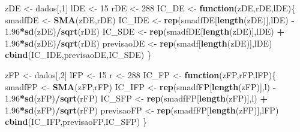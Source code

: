 \documentclass[]{article}
\newenvironment{Shaded}{\begin{snugshade}}{\end{snugshade}}
\newcommand{\ControlFlowTok}[1]{\textcolor[rgb]{0.13,0.29,0.53}{\textbf{#1}}}
\newcommand{\DecValTok}[1]{\textcolor[rgb]{0.00,0.00,0.81}{#1}}
\newcommand{\FloatTok}[1]{\textcolor[rgb]{0.00,0.00,0.81}{#1}}
\newcommand{\KeywordTok}[1]{\textcolor[rgb]{0.13,0.29,0.53}{\textbf{#1}}}
\newcommand{\NormalTok}[1]{#1}
\newcommand{\OperatorTok}[1]{\textcolor[rgb]{0.81,0.36,0.00}{\textbf{#1}}}
\newcommand{\StringTok}[1]{\textcolor[rgb]{0.31,0.60,0.02}{#1}}
\begin{document}
\begin{Shaded}
\begin{Highlighting}[]
\NormalTok{zDE <-}\StringTok{ }\NormalTok{dados[,}\DecValTok{1}\NormalTok{]}
\NormalTok{lDE <-}\StringTok{ }\DecValTok{15}
\NormalTok{rDE <-}\StringTok{ }\DecValTok{288}
\NormalTok{IC_DE <-}\StringTok{ }\ControlFlowTok{function}\NormalTok{(zDE,rDE,lDE)\{}
\NormalTok{smadfDE <-}\StringTok{ }\KeywordTok{SMA}\NormalTok{(zDE,rDE)}
\NormalTok{IC_IDE <-}\StringTok{ }\KeywordTok{rep}\NormalTok{(smadfDE[}\KeywordTok{length}\NormalTok{(zDE)],lDE) }\OperatorTok{-}\StringTok{ }\FloatTok{1.96}\OperatorTok{*}\KeywordTok{sd}\NormalTok{(zDE)}\OperatorTok{/}\KeywordTok{sqrt}\NormalTok{(rDE)}
\NormalTok{IC_SDE <-}\StringTok{ }\KeywordTok{rep}\NormalTok{(smadfDE[}\KeywordTok{length}\NormalTok{(zDE)],lDE) }\OperatorTok{+}\StringTok{ }\FloatTok{1.96}\OperatorTok{*}\KeywordTok{sd}\NormalTok{(zDE)}\OperatorTok{/}\KeywordTok{sqrt}\NormalTok{(rDE)}
\NormalTok{previsaoDE <-}\StringTok{ }\KeywordTok{rep}\NormalTok{(smadf[}\KeywordTok{length}\NormalTok{(zDE)],lDE)}
\KeywordTok{cbind}\NormalTok{(IC_IDE,previsaoDE,IC_SDE)}
\NormalTok{\}}


\NormalTok{zFP <-}\StringTok{ }\NormalTok{dados[,}\DecValTok{2}\NormalTok{]}
\NormalTok{lFP <-}\StringTok{ }\DecValTok{15}
\NormalTok{r <-}\StringTok{ }\DecValTok{288}
\NormalTok{IC_FP <-}\StringTok{ }\ControlFlowTok{function}\NormalTok{(zFP,rFP,lFP)\{}
\NormalTok{smadfFP <-}\StringTok{ }\KeywordTok{SMA}\NormalTok{(zFP,rFP)}
\NormalTok{IC_IFP <-}\StringTok{ }\KeywordTok{rep}\NormalTok{(smadfFP[}\KeywordTok{length}\NormalTok{(zFP)],l) }\OperatorTok{-}\StringTok{ }\FloatTok{1.96}\OperatorTok{*}\KeywordTok{sd}\NormalTok{(zFP)}\OperatorTok{/}\KeywordTok{sqrt}\NormalTok{(rFP)}
\NormalTok{IC_SFP <-}\StringTok{ }\KeywordTok{rep}\NormalTok{(smadfFP[}\KeywordTok{length}\NormalTok{(zFP)],l) }\OperatorTok{+}\StringTok{ }\FloatTok{1.96}\OperatorTok{*}\KeywordTok{sd}\NormalTok{(zFP)}\OperatorTok{/}\KeywordTok{sqrt}\NormalTok{(rFP)}
\NormalTok{previsaoFP <-}\StringTok{ }\KeywordTok{rep}\NormalTok{(smadfFP[}\KeywordTok{length}\NormalTok{(zFP)],lFP)}
\KeywordTok{cbind}\NormalTok{(IC_IFP,previsaoFP,IC_SFP)}
\NormalTok{\}}


\end{Highlighting}
\end{Shaded}
\end{document}
